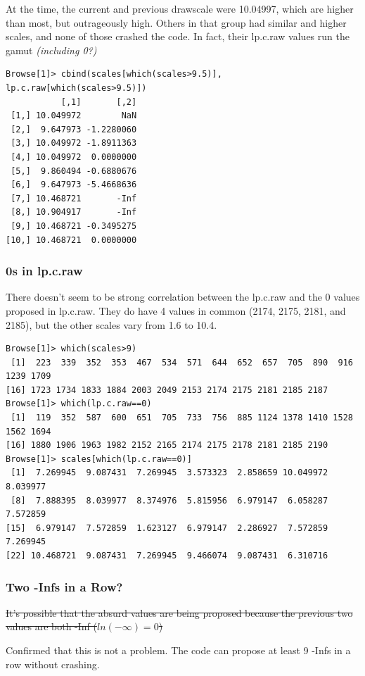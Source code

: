 At the time, the current and previous drawscale were 10.04997, which are higher than most, but outrageously high. Others in that group had similar and higher scales, and none of those crashed the code. In fact, their lp.c.raw values run the gamut \textit{(including 0?)}

\begin{verbatim}
Browse[1]> cbind(scales[which(scales>9.5)], lp.c.raw[which(scales>9.5)])
           [,1]       [,2]
 [1,] 10.049972        NaN
 [2,]  9.647973 -1.2280060
 [3,] 10.049972 -1.8911363
 [4,] 10.049972  0.0000000
 [5,]  9.860494 -0.6880676
 [6,]  9.647973 -5.4668636
 [7,] 10.468721       -Inf
 [8,] 10.904917       -Inf
 [9,] 10.468721 -0.3495275
[10,] 10.468721  0.0000000
\end{verbatim}

\subsubsection{0s in lp.c.raw}

There doesn't seem to be strong correlation between the lp.c.raw and the 0 values proposed in lp.c.raw. They do have 4 values in common (2174, 2175, 2181, and 2185), but the other scales vary from 1.6 to 10.4.

\begin{verbatim}
Browse[1]> which(scales>9)
 [1]  223  339  352  353  467  534  571  644  652  657  705  890  916 1239 1709
[16] 1723 1734 1833 1884 2003 2049 2153 2174 2175 2181 2185 2187
Browse[1]> which(lp.c.raw==0)
 [1]  119  352  587  600  651  705  733  756  885 1124 1378 1410 1528 1562 1694
[16] 1880 1906 1963 1982 2152 2165 2174 2175 2178 2181 2185 2190
Browse[1]> scales[which(lp.c.raw==0)]
 [1]  7.269945  9.087431  7.269945  3.573323  2.858659 10.049972  8.039977
 [8]  7.888395  8.039977  8.374976  5.815956  6.979147  6.058287  7.572859
[15]  6.979147  7.572859  1.623127  6.979147  2.286927  7.572859  7.269945
[22] 10.468721  9.087431  7.269945  9.466074  9.087431  6.310716
\end{verbatim}


\subsubsection{Two -Infs in a Row?}

\sout{It's possible that the absurd values are being proposed because the previous two values are both -Inf ($ln(-\infty)=0$)}

Confirmed that this is not a problem. The code can propose at least 9 -Infs in a row without crashing.



